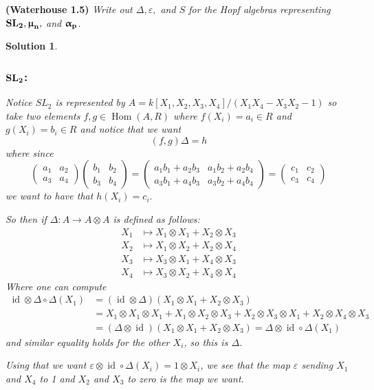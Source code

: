 \documentclass[12pt]{article}
\theoremstyle{nonumberbreak}
\newtheorem{sol}{Solution}
\theoremstyle{changebreak}
\theoremstyle{nonumberplain}
\theoremstyle{change}
\newenvironment{wprob}[1]{\begin{prob}{\normalfont\bfseries (Waterhouse #1) }\itshape}{\end{prob}}
\DeclareMathOperator{\Hom}{Hom}
\newcommand*{\SL}[1]{\ensuremath\mathbf{SL_#1}}
\newcommand*{\mun}[1]{\ensuremath\mathbf{\bm\upmu_#1}}
\newcommand*{\alp}[1]{\ensuremath\mathbf{\bm\upalpha_#1}}
\DeclareMathOperator{\id}{id}
\begin{document}
\begin{wprob}{1.5}
	Write out $\Delta,\varepsilon,$ and $S$ for the Hopf algebras representing $\SL{2}, \mun{n},$ and $\alp{p}$.
\end{wprob}
\begin{sol}
	\subsubsection*{$\SL{2}$:}
	Notice $SL_2$ is represented by $A=k[X_1,X_2,X_3,X_4]/(X_1X_4-X_3X_2-1)$ so take two elements
	$f,g\in\Hom(A,R)$ where $f(X_i)=a_i\in R$ and $g(X_i)=b_i\in R$ and notice that we want
	\[(f,g)\Delta=h\]
	where since
	\[\begin{pmatrix}
		a_1 & a_2\\ a_3 & a_4
	\end{pmatrix}\begin{pmatrix}
		b_1 & b_2\\ b_3 & b_4
	\end{pmatrix}=\begin{pmatrix}
		a_1b_1+a_2b_3 & a_1b_2+a_2b_4\\ a_3b_1+a_4b_3 & a_3b_2+a_4b_4
	\end{pmatrix}=\begin{pmatrix}
		c_1 & c_2\\ c_3 & c_4
	\end{pmatrix}\]
	we want to have that $h(X_i)=c_i.$

	So then if $\Delta:A\to A\otimes A$ is defined as follows:
	\begin{align*}
		X_1&\mapsto X_1\otimes X_1+X_2\otimes X_3\\
		X_2&\mapsto X_1\otimes X_2 +X_2\otimes X_4\\
		X_3&\mapsto X_3\otimes X_1+X_4\otimes X_3\\
		X_4&\mapsto X_3\otimes X_2+X_4\otimes X_4
	\end{align*}
	Where one can compute
	\begin{align*}
		\id\otimes\Delta\circ \Delta (X_1)&= (\id\otimes\Delta)(X_1\otimes X_1+X_2\otimes X_3)\\
		&= X_1\otimes X_1\otimes X_1 + X_1\otimes X_2\otimes X_3 + X_2\otimes X_3\otimes X_1 + X_2\otimes X_4\otimes X_3\\
		&= (\Delta\otimes\id)(X_1\otimes X_1+X_2\otimes X_3)=\Delta\otimes\id\circ \Delta (X_1)
	\end{align*}
	and similar equality holds for the other $X_i$, so this is $\Delta$. 

	Using that we want $\varepsilon\otimes\id\circ \Delta(X_i)=1\otimes X_i$, we see that the map
	$\varepsilon$ sending $X_1$ and $X_4$ to 1 and $X_2$ and $X_3$ to zero is the map we want.


\end{sol}
\end{document}
